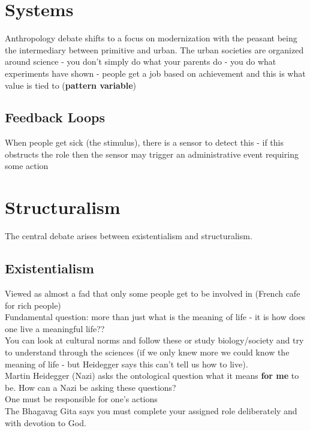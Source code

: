 \documentclass{article}
\begin{document}
\section{Systems}
Anthropology debate shifts to a focus on modernization with the peasant being the intermediary between primitive and urban. The urban societies are organized around science - you don't simply do what your parents do - you do what experiments have shown - people get a job based on achievement and this is what value is tied to (\textbf{pattern variable}) \\
\subsection{Feedback Loops}
When people get sick (the stimulus), there is a sensor to detect this - if this obstructs the role then the sensor may trigger an administrative event requiring some action
\section{Structuralism}
The central debate arises between existentialism and structuralism. \\
\subsection{Existentialism}
Viewed as almost a fad that only some people get to be involved in (French cafe for rich people) \\
Fundamental question: more than just what is the meaning of life - it is how does one live a meaningful life?? \\
You can look at cultural norms and follow these or study biology/society and try to understand through the sciences (if we only knew more we could know the meaning of life - but Heidegger says this can't tell us how to live). \\
Martin Heidegger (Nazi) asks the ontological question what it means \textbf{for me} to be. How can a Nazi be asking these questions? \\
One must be responsible for one's actions \\
The Bhagavag Gita says you must complete your assigned role deliberately and with devotion to God. 
\end{document}

